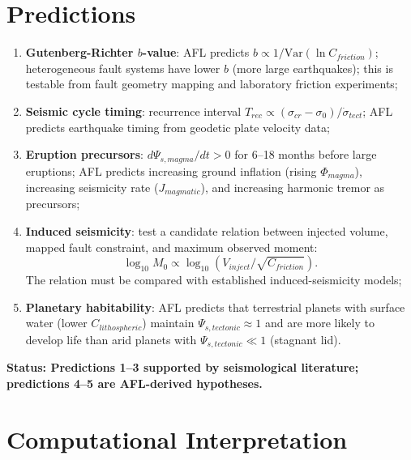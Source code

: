 \documentclass[11pt]{article}
\begin{document}
\section{Predictions}

\begin{enumerate}
    \item \textbf{Gutenberg-Richter $b$-value}: AFL predicts $b \propto 1/\text{Var}(\ln C_{friction})$;
          heterogeneous fault systems have lower $b$ (more large earthquakes); this is testable
          from fault geometry mapping and laboratory friction experiments;
    \item \textbf{Seismic cycle timing}: recurrence interval $T_{rec} \propto (\sigma_{cr} - \sigma_0)/
          \dot{\sigma}_{tect}$; AFL predicts earthquake timing from geodetic plate velocity data;
    \item \textbf{Eruption precursors}: $d\Psi_{s,magma}/dt > 0$ for 6--18 months before large eruptions;
          AFL predicts increasing ground inflation (rising $\Phi_{magma}$), increasing seismicity
          rate ($J_{magmatic}$), and increasing harmonic tremor as precursors;
    \item \textbf{Induced seismicity}: test a candidate relation between injected volume,
          mapped fault constraint, and maximum observed moment:
          \[
          \log_{10} M_0 \propto \log_{10}\left(V_{inject}/\sqrt{C_{friction}}\right).
          \]
          The relation must be compared with established induced-seismicity models;
    \item \textbf{Planetary habitability}: AFL predicts that terrestrial planets with surface water
          (lower $C_{lithospheric}$) maintain $\Psi_{s,tectonic} \approx 1$ and are more likely to
          develop life than arid planets with $\Psi_{s,tectonic} \ll 1$ (stagnant lid).
\end{enumerate}

\textbf{Status: Predictions 1--3 supported by seismological literature; predictions 4--5 are AFL-derived
hypotheses.}

\section{Computational Interpretation}
\end{document}
